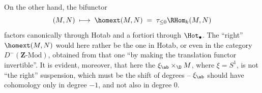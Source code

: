 On the other hand, the bifunctor
\[
(M,N)\;\longmapsto\;\homext(M,N)\;=\;\tau_{\le 0}\RHom_k(M,N)
\]
factors canonically through Hotab and a fortiori through $\Hot_{\bullet}$. The ``right'' $\homext(M,N)$ would here rather be the one in Hotab, or even in the category $D^{-}(\mathbf{Z}\text{-Mod})$, obtained from that one ``by making the translation functor invertible''. It is evident, moreover, that here the $\xi_{\ab}\times_{\D}M$, where $\xi=S^1$, is not ``the right'' suspension, which must be the shift of degrees – $\xi_{\ab}$ should have cohomology only in degree $-1$, and not also in degree $0$.